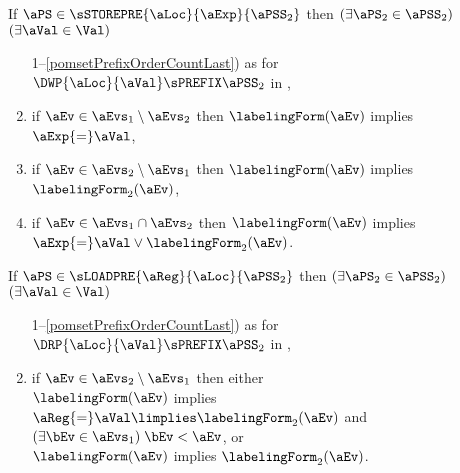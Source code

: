 \begin{definition}
  \noindent
  If $\aPS \in \sSTOREPRE{\aLoc}{\aExp}{\aPSS_2}$ then
  $(\exists\aPS_2\in\aPSS_2)$
  $(\exists\aVal\in\Val)$
  \begin{enumerate}[topsep=0pt]
    \setcounter{enumi}{\value{pomsetPrefixOrderCount}}
  \item[1--\ref{pomsetPrefixOrderCountLast})]
    as for $\DWP{\aLoc}{\aVal}\sPREFIX\aPSS_2$ in , %
  \item \label{storepre-kappa1}
    if $\aEv\in\aEvs_1\setminus\aEvs_2$ then $\labelingForm(\aEv)$ implies $\aExp{=}\aVal$,
  \item \label{storepre-kappa2}
    if $\aEv\in\aEvs_2\setminus\aEvs_1$ then $\labelingForm(\aEv)$ implies $\labelingForm_2(\aEv)$,
  \item \label{storepre-kappa12}
    if $\aEv\in\aEvs_1\cap\aEvs_2$ then $\labelingForm(\aEv)$ implies $\aExp{=}\aVal \lor \labelingForm_2(\aEv)$.
  \end{enumerate}

  \noindent
  If $\aPS \in \sLOADPRE{\aReg}{\aLoc}{\aPSS_2}$ then
  $(\exists\aPS_2\in\aPSS_2)$
  $(\exists\aVal\in\Val)$
  \begin{enumerate}[topsep=0pt]
    \setcounter{enumi}{\value{pomsetPrefixOrderCount}}
  \item[1--\ref{pomsetPrefixOrderCountLast})]
    as for $\DRP{\aLoc}{\aVal}\sPREFIX\aPSS_2$ in , %
  \item \label{loadpre-kappa2}
    if $\aEv\in\aEvs_2\setminus\aEvs_1$ then either \\
    $\labelingForm(\aEv)$ implies $\aReg{=}\aVal\limplies\labelingForm_2(\aEv)$ and $(\exists\bEv\in\aEvs_1)\;\bEv<\aEv$, or \\
    $\labelingForm(\aEv)$ implies $\labelingForm_2(\aEv)$.
  \end{enumerate}  


\end{definition}

